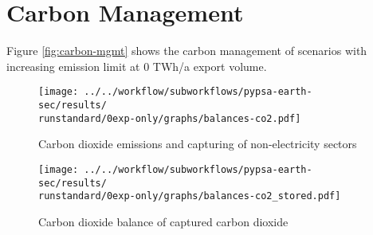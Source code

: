 \section{Carbon Management}
\label{subsec:carbon_mgmt}

Figure \ref{fig:carbon-mgmt} shows the carbon management of scenarios with increasing emission limit at 0 TWh/a export volume.


\begin{figure*}[h!] %
    \centering
    \begin{subfigure}[b]{0.49\linewidth}
        \centering
        \texttt{[image: ../../workflow/subworkflows/pypsa-earth-sec/results/\\runstandard/0exp-only/graphs/balances-co2.pdf]}
        \caption{Carbon dioxide emissions and capturing of non-electricity sectors}
        \label{fig:carbon-atmo}
    \end{subfigure}
    \hfill
    \begin{subfigure}[b]{0.49\linewidth}
        \centering
        \texttt{[image: ../../workflow/subworkflows/pypsa-earth-sec/results/\\runstandard/0exp-only/graphs/balances-co2\_stored.pdf]}
        \caption{Carbon dioxide balance of captured carbon dioxide}
        \label{fig:carbon-store}
    \end{subfigure}
    \hfill
    \caption{Carbon dioxide \ref{fig:carbon-atmo} emissions and capturing as well as \ref{fig:carbon-store} management of captured carbon dioxide}
    \label{fig:carbon-mgmt}
\end{figure*}


\clearpage